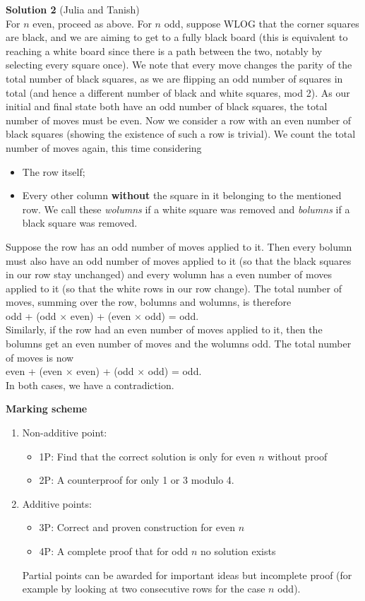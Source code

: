 \textbf{Solution 2} (Julia and Tanish)\\
For $n$ even, proceed as above.
For $n$ odd, suppose WLOG that the corner squares are black, and we are aiming to get to a fully black board (this is equivalent to reaching a white board since there is a path between the two, notably by selecting every square once). We note that every move changes the parity of the total number of black squares, as we are flipping an odd number of squares in total (and hence a different number of black and white squares, mod 2). As our initial and final state both have an odd number of black squares, the total number of moves must be even.
Now we consider a row with an even number of black squares (showing the existence of such a row is trivial). We count the total number of moves again, this time considering 
\begin{itemize}
\item The row itself;
\item Every other column \textbf{without} the square in it belonging to the mentioned row. We call these \emph{wolumns} if a white square was removed and \emph{bolumns} if a black square was removed.
\end{itemize}
Suppose the row has an odd number of moves applied to it. Then every bolumn must also have an odd number of moves applied to it (so that the black squares in our row stay unchanged) and every wolumn has a even number of moves applied to it (so that the white rows in our row change). The total number of moves, summing over the row, bolumns and wolumns, is therefore\\ odd + (odd $\times$ even) + (even $\times$ odd) = odd.\\
Similarly, if the row had an even number of moves applied to it, then the bolumns get an even number of moves and the wolumns odd. The total number of moves is now\\
even + (even $\times$ even) + (odd $\times$ odd) = odd.\\
In both cases, we have a contradiction. 

\textbf{Marking scheme}
\begin{enumerate}
    \item Non-additive point:
\begin{itemize}
    \item 1P: Find that the correct solution is only for even $n$ without proof
    \item 2P: A counterproof for only 1 or 3 modulo 4.
\end{itemize}

\item Additive points:
\begin{itemize}
    \item   3P: Correct and proven construction for even $n$
    \item   4P: A complete proof that for odd $n$ no solution exists
\end{itemize}
Partial points can be awarded for important ideas but incomplete proof (for example by looking at two consecutive rows for the case $n$ odd).

\end{enumerate}